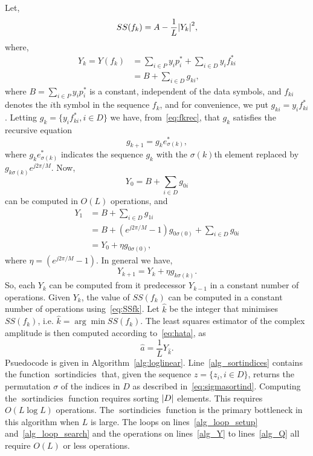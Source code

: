 \documentclass[journal]{IEEEtran}
\begin{document}
Let,
\begin{equation}\label{eq:SSfk}
SS(f_k) = A - \frac{1}{L}{\left| Y_k \right|}^2,
\end{equation}
where, 
\begin{align*}
Y_k = Y( f_k ) &= \sum_{i \in P} y_i p_i^*  + \sum_{i \in D} y_i f_{ki}^* \\
&= B + \sum_{i \in D}g_{ki},
\end{align*}
where $B = \sum_{i \in P} y_i p_i^*$ is a constant, independent of the data symbols, and $f_{ki}$ denotes the $i$th symbol in the sequence $f_k$, and for convenience, we put $g_{ki}  = y_i f_{ki}^*$.  Letting $g_{k} =\{ y_i f_{ki}^*, i \in D\}$ we have, from~\eqref{eq:fkrec}, that $g_k$ satisfies the recursive equation
\[
g_{k+1} = g_{k} e_{\sigma(k)}^*,
\]
where $g_{k} e_{\sigma(k)}^*$ indicates the sequence $g_k$ with the $\sigma(k)$th element replaced by $g_{k \sigma(k)}e^{j2\pi/M}$.  Now,
\[
Y_0 = B + \sum_{i \in D} g_{0i}
\] 
can be computed in $O(L)$ operations, and
\begin{align*}
Y_1 &= B + \sum_{i \in D} g_{1i} \\
&= B +  (e^{j2\pi/M} - 1)g_{0\sigma(0)} + \sum_{i \in D} g_{0i} \\
&= Y_0 + \eta g_{0\sigma(0)},
\end{align*}
where $\eta = (e^{j2\pi/M} - 1)$.  In general we have,
\[
Y_{k+1} = Y_k + \eta g_{k\sigma(k)}.
\]
So, each $Y_k$ can be computed from it predecessor $Y_{k-1}$ in a constant number of operations.  Given $Y_k$, the value of $SS(f_k)$ can be computed in a constant number of operations using~\eqref{eq:SSfk}.  Let $\hat{k}$ be the integer that minimises $SS(f_k)$, i.e. $\hat{k} = \arg\min SS(f_k)$.  The least squares estimator of the complex amplitude is then computed according to~\eqref{eq:hata}, as 
\begin{equation}\label{eq:ahatYhat}
\hat{a} = \frac{1}{L} Y_{\hat{k}}.
\end{equation}
Psuedocode is given in Algorithm~\ref{alg:loglinear}.  Line~\ref{alg_sortindices} contains the function $\operatorname{sortindicies}$ that, given the sequence $z = \{z_i, i \in D\}$, returns the permutation $\sigma$ of the indices in $D$ as described in~\eqref{eq:sigmasortind}.  Computing the $\operatorname{sortindicies}$ function requires sorting ${\left| D \right|}$ elements.  This requires $O(L \log L)$ operations.  The $\operatorname{sortindicies}$ function is the primary bottleneck in this algorithm when $L$ is large.  The loops on lines~\ref{alg_loop_setup} and~\ref{alg_loop_search} and the operations on lines~\ref{alg_Y} to lines~\ref{alg_Q} all require $O(L)$ or less operations.  %
\end{document}
